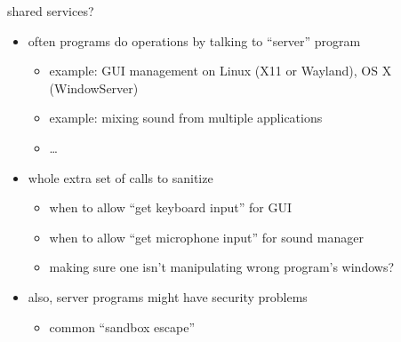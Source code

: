 \begin{frame}{shared services?}
    \begin{itemize}
    \item often programs do operations by talking to ``server'' program
        \begin{itemize}
        \item example: GUI management on Linux (X11 or Wayland), OS X (WindowServer)
        \item example: mixing sound from multiple applications
        \item \ldots
        \end{itemize}
    \item whole extra set of calls to sanitize
        \begin{itemize}
        \item when to allow ``get keyboard input'' for GUI
        \item when to allow ``get microphone input'' for sound manager
        \item making sure one isn't manipulating wrong program's windows?
        \end{itemize}
    \item also, server programs might have security problems
        \begin{itemize}
        \item common ``sandbox escape''
        \end{itemize}
    \end{itemize}
\end{frame}

